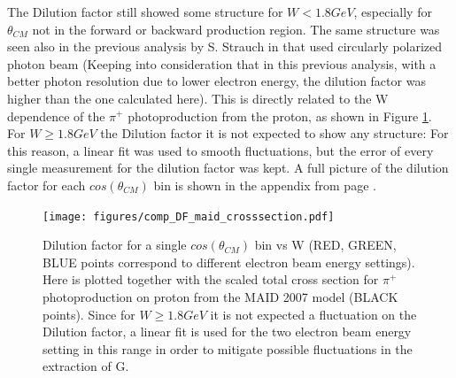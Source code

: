 The Dilution factor still showed some structure for $W < 1.8GeV$, especially for $\theta_{CM}$ not in the forward or backward production region. The same structure was seen also in the previous analysis by S. Strauch in \cite{Strauch_2014} that used circularly polarized photon beam (Keeping into consideration that in this previous analysis, with a better photon resolution due to lower electron energy, the dilution factor was higher than the one calculated here). This is directly related to the W dependence of the $\pi^+$ photoproduction from the proton, as shown in Figure \ref{fig:comparison_dilutionfactor}. For $W \geq 1.8GeV$ the Dilution factor it is not expected to show any structure: For this reason, a linear fit was used to smooth fluctuations, but the error of every single measurement for the dilution factor was kept. A full picture of the dilution factor for each $cos(\theta_{CM})$ bin is shown in the appendix from page \pageref{app:dilfactor}.  

\begin{figure}[htb]
  \begin{center}
    \texttt{[image: figures/comp\_DF\_maid\_crosssection.pdf]} \\
    \caption{Dilution factor for a single $cos(\theta_{CM})$ bin vs W (RED, GREEN, BLUE points correspond to different electron beam energy settings). Here is plotted together with the scaled total cross section for $\pi^+$ photoproduction on proton from the MAID 2007 model \cite{MAID_2007} (BLACK points). Since for $W \geq 1.8GeV$ it is not expected a fluctuation on the Dilution factor, a linear fit is used for the two electron beam energy setting in this range in order to mitigate possible fluctuations in the extraction of G.}
    \label{fig:comparison_dilutionfactor}
  \end{center}
\end{figure}


